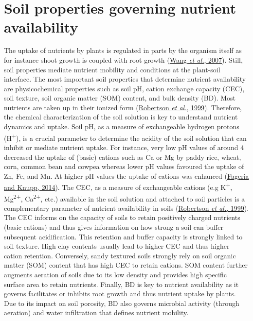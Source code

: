 \documentclass[
  10pt,
  b5paper,
  oneside]{book}
\begin{document}
\hypertarget{soil-properties-governing-nutrient-availability}{%
\section{Soil properties governing nutrient availability}\label{soil-properties-governing-nutrient-availability}}

The uptake of nutrients by plants is regulated in parts by the organism itself as for instance shoot growth is coupled with root growth (\protect\hyperlink{ref-wang2007}{Wang \emph{et al.}, 2007}). Still, soil properties mediate nutrient mobility and conditions at the plant-soil interface. The most important soil properties that determine nutrient availability are physicochemical properties such as soil pH, cation exchange capacity (CEC), soil texture, soil organic matter (SOM) content, and bulk density (BD).
Most nutrients are taken up in their ionized form (\protect\hyperlink{ref-robertson1999}{Robertson \emph{et al.}, 1999}). Therefore, the chemical characterization of the soil solution is key to understand nutrient dynamics and uptake.
Soil pH, as a measure of exchangeable hydrogen protons (H\textsuperscript{+}), is a crucial parameter to determine the acidity of the soil solution that can inhibit or mediate nutrient uptake. For instance, very low pH values of around 4 decreased the uptake of (basic) cations such as Ca or Mg by paddy rice, wheat, corn, common bean and cowpea whereas lower pH values favoured the uptake of Zn, Fe, and Mn. At higher pH values the uptake of cations was enhanced (\protect\hyperlink{ref-fageria2014}{Fageria and Knupp, 2014}).
The CEC, as a measure of exchangeable cations (e.g K\textsuperscript{+}, Mg\textsuperscript{2+}, Ca\textsuperscript{2+}, etc.) available in the soil solution and attached to soil particles is a complementary parameter of nutrient availability in soils (\protect\hyperlink{ref-robertson1999}{Robertson \emph{et al.}, 1999}). The CEC informs on the capacity of soils to retain positively charged nutrients (basic cations) and thus gives information on how strong a soil can buffer subsequent acidification. This retention and buffer capacity is strongly linked to soil texture. High clay contents usually lead to higher CEC and thus higher cation retention. Conversely, sandy textured soils strongly rely on soil organic matter (SOM) content that has high CEC to retain cations.
SOM content further augments aeration of soils due to its low density and provides high specific surface area to retain nutrients.
Finally, BD is key to nutrient availability as it governs facilitates or inhibits root growth and thus nutrient uptake by plants. Due to its impact on soil porosity, BD also governs microbial activity (through aeration) and water infiltration that defines nutrient mobility.
\end{document}
